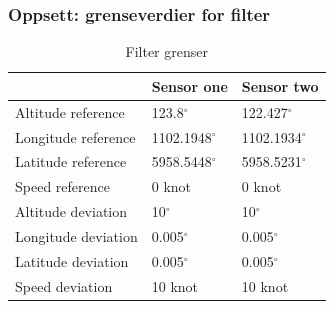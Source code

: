 \documentclass[xcolor=table]{beamer}
\begin{document}
\begin{frame}
  \frametitle{Oppsett: grenseverdier for filter}
    \begin{table}[!htb]
      \centering
      \caption{Filter grenser}
      \label{gps_filter_table}
        \begin{tabular}{|l|l|l|}
        \hline
        \multicolumn{1}{|c|}{} & \multicolumn{1}{c|}{Sensor one} & \multicolumn{1}{c|}{Sensor two}         \\ \hline
        Altitude reference                 & 123.8$^{\circ}$ & 122.427$^{\circ}$                            \\ \hline
        Longitude reference                & 1102.1948$^{\circ}$ & 1102.1934$^{\circ}$                     \\ \hline
        Latitude reference                 & 5958.5448$^{\circ}$ & 5958.5231$^{\circ}$                     \\ \hline
        Speed reference                    & 0 knot        & 0 knot                                       \\ \hline
        Altitude deviation                 & 10$^{\circ}$        & 10$^{\circ}$                            \\ \hline
        Longitude deviation                & 0.005$^{\circ}$     & 0.005$^{\circ}$                         \\ \hline
        Latitude deviation                 & 0.005$^{\circ}$     & 0.005$^{\circ}$                         \\ \hline
        Speed deviation                    & 10 knot        & 10 knot                                     \\ \hline
        \end{tabular}
    \end{table}
\end{frame}
\end{document}
